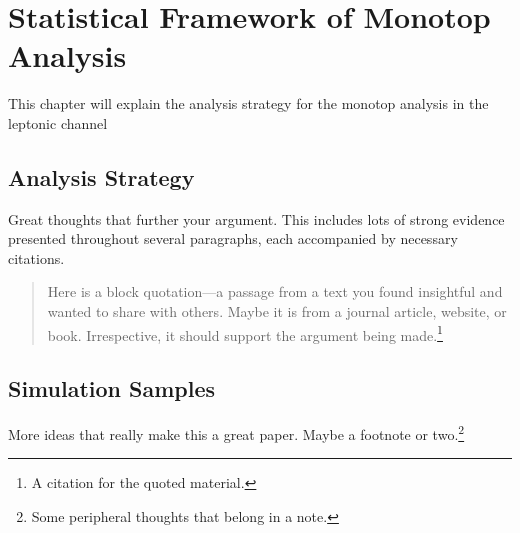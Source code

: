 \chapter{Statistical Framework of Monotop Analysis}
\label{chapter:five}
This chapter will explain the analysis strategy for the monotop analysis in the leptonic channel
\section{Analysis Strategy}

Great thoughts that further your argument. This includes lots of strong evidence presented throughout several paragraphs, each accompanied by necessary citations.
\begin{quotation}
    \noindent Here is a block quotation---a passage from a text you found insightful and wanted to share with others. Maybe it is from a journal article, website, or book. Irrespective, it should support the argument being made.\footnote{A citation for the quoted material.}
\end{quotation}



\section{Simulation Samples}

More ideas that really make this a great paper. Maybe a footnote or two.\footnote{Some peripheral thoughts that belong in a note.}


